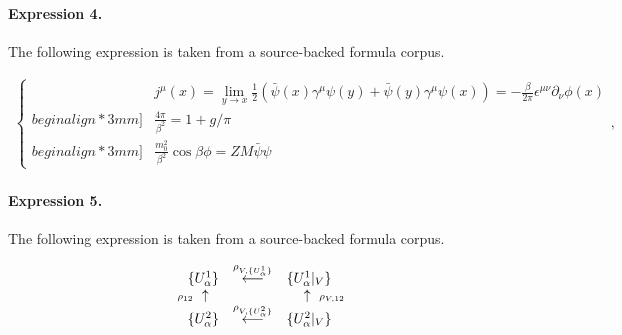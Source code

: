 \documentclass[11pt]{article}
\begin{document}
\paragraph{Expression 4.} The following expression is taken from a source-backed formula corpus.

\begin{align*}\left \{\begin{array}{ll}& j^{\mu}(x) = \lim\limits_{y\rightarrow x}\frac{1}{2}\left(\bar{\psi}(x)\gamma^{\mu}\psi(y) + \bar{\psi}(y)\gamma^\mu\psi(x)\right) = -\frac{\beta}{2\pi}\epsilon^{\mu\nu}\partial_{\nu}\phi(x)\\begin{align*}3mm] &\frac{4\pi}{\beta^2} = 1 + g/\pi \\begin{align*}3mm] &\frac{m_0^2}{\beta^2}\cos \beta\phi = Z M \bar{\psi}\psi \end{array}\right.,\end{align*}

\paragraph{Expression 5.} The following expression is taken from a source-backed formula corpus.

\begin{align*}\begin{array}{ccc}\{ U^1_{\alpha} \} & \stackrel{ \rho_{V, \{ U^1_{\alpha} \}} }{ \longleftarrow } & \{ U^1_{\alpha} |_V \} \\\makebox[0pt][r]{ $\scriptstyle{ \rho_{12} }$ } \uparrow & &\uparrow \makebox[0pt][l]{ $\scriptstyle{ \rho_{V, 12} }$ } \\\{ U^2_{\alpha} \} & \stackrel{ \rho_{V, \{ U^2_{\alpha} \} } }{ \longleftarrow } & \{ U^2_{\alpha} |_V \}\end{array}\end{align*}
\end{document}
